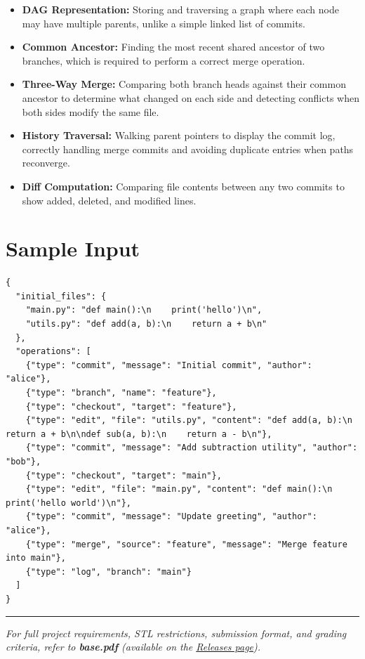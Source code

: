 \begin{itemize}
  \item \textbf{DAG Representation:} Storing and traversing a graph where each node may have multiple parents, unlike a simple linked list of commits.
  \item \textbf{Common Ancestor:} Finding the most recent shared ancestor of two branches, which is required to perform a correct merge operation.
  \item \textbf{Three-Way Merge:} Comparing both branch heads against their common ancestor to determine what changed on each side and detecting conflicts when both sides modify the same file.
  \item \textbf{History Traversal:} Walking parent pointers to display the commit log, correctly handling merge commits and avoiding duplicate entries when paths reconverge.
  \item \textbf{Diff Computation:} Comparing file contents between any two commits to show added, deleted, and modified lines.
\end{itemize}

\section{Sample Input}

\begin{lstlisting}[style=json, caption={data/input\_sample.json}]
{
  "initial_files": {
    "main.py": "def main():\n    print('hello')\n",
    "utils.py": "def add(a, b):\n    return a + b\n"
  },
  "operations": [
    {"type": "commit", "message": "Initial commit", "author": "alice"},
    {"type": "branch", "name": "feature"},
    {"type": "checkout", "target": "feature"},
    {"type": "edit", "file": "utils.py", "content": "def add(a, b):\n    return a + b\n\ndef sub(a, b):\n    return a - b\n"},
    {"type": "commit", "message": "Add subtraction utility", "author": "bob"},
    {"type": "checkout", "target": "main"},
    {"type": "edit", "file": "main.py", "content": "def main():\n    print('hello world')\n"},
    {"type": "commit", "message": "Update greeting", "author": "alice"},
    {"type": "merge", "source": "feature", "message": "Merge feature into main"},
    {"type": "log", "branch": "main"}
  ]
}
\end{lstlisting}

\vfill
\noindent\rule{\textwidth}{0.4pt}
{\small\textit{For full project requirements, STL restrictions, submission format, and grading criteria, refer to \textbf{base.pdf} (available on the \href{https://github.com/BestSithInEU/cse211-term-projects/releases}{Releases page}).}}
